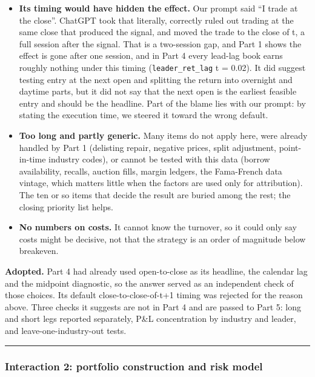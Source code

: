 \begin{itemize}
\tightlist
\item
  \textbf{Its timing would have hidden the effect.} Our prompt said ``I trade at the close''.
  ChatGPT took that literally, correctly ruled out trading at the same close that produced
  the signal, and moved the trade to the close of t, a full session after the signal. That
  is a two-session gap, and Part 1 shows the effect is gone
  after one session, and in Part 4 every lead-lag book earns roughly nothing under this
  timing (\texttt{leader\_ret\_lag} t = 0.02). It did suggest testing entry at the next open and
  splitting the return into overnight and daytime parts, but it did not say that the next
  open is the earliest feasible entry and should be the headline. Part of the blame lies
  with our prompt: by stating the execution time, we steered it toward the wrong default.
\item
  \textbf{Too long and partly generic.} Many items do not apply here, were already handled
  by Part 1 (delisting repair, negative prices, split adjustment, point-in-time
  industry codes), or cannot be tested with this data (borrow availability, recalls,
  auction fills, margin ledgers, the Fama-French data vintage, which matters little when
  the factors are used only for attribution). The ten or so items that decide the result
  are buried among the rest; the closing priority list helps.
\item
  \textbf{No numbers on costs.} It cannot know the turnover, so it could only say costs might
  be decisive, not that the strategy is an order of magnitude below breakeven.
\end{itemize}

\textbf{Adopted.} Part 4 had already used open-to-close as its headline, the calendar lag and
the midpoint diagnostic, so the answer served as an independent check of those choices.
Its default close-to-close-of-t+1 timing was rejected for the reason above. Three checks
it suggests are not in Part 4 and are passed to Part 5: long and short legs reported
separately, P\&L concentration by industry and leader, and leave-one-industry-out tests.

\begin{center}\rule{0.5\linewidth}{0.5pt}\end{center}

\hypertarget{interaction-2-portfolio-construction-and-risk-model}{%
\subsubsection{Interaction 2: portfolio construction and risk model}\label{interaction-2-portfolio-construction-and-risk-model}}

